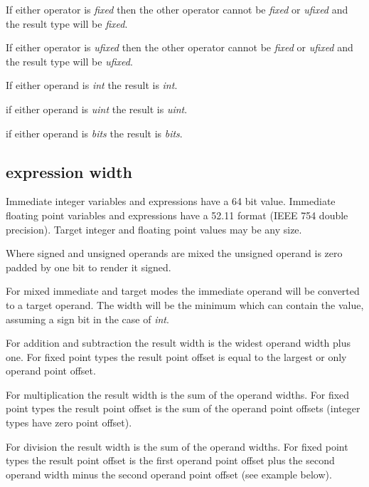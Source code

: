             \blist
            \item   If either operator is {\em fixed} then the other operator
                    cannot be {\em fixed} or {\em ufixed} and the result type
                    will be {\em fixed}.                    
            \item   If either operator is {\em ufixed} then the other operator
                    cannot be {\em fixed} or {\em ufixed} and the result type
                    will be {\em ufixed}.                    
            \item   If either operand is {\em int} the result is {\em int}.
            \item   if either operand is {\em uint} the result is {\em uint}.
            \item   if either operand is {\em bits} the result is {\em bits}.
            \blend

        \subsection{expression width}

            Immediate integer variables and expressions have a 64 bit value.
            Immediate floating point variables and expressions have a 52.11
            format (IEEE 754 double precision). Target integer and floating
            point values may be any size.
        
            Where signed and unsigned operands are mixed the unsigned operand is
            zero padded by one bit to render it signed.

            For mixed immediate and target modes the immediate operand will be
            converted to a target operand. The width will be the minimum which
            can contain the value, assuming a sign bit in the case of {\em int}.

            For addition and subtraction the result width is the widest operand
            width plus one. For fixed point types the result point offset is
            equal to the largest or only operand point offset.

            For multiplication the result width is the sum of the operand
            widths. For fixed point types the result point offset is the sum of
            the operand point offsets (integer types have zero point offset).

            For division the result width is the sum of the operand widths. For
            fixed point types the result point offset is the first operand point
            offset plus the second operand width minus the second operand point
            offset (see example below).

